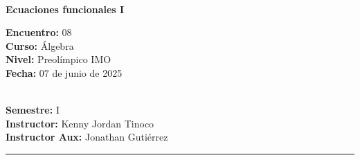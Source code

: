 \begin{center}
    \ \\
    \vspace{-4mm}
    \textbf{\Large Ecuaciones funcionales I}
\end{center}
\vspace{-5mm}
\begin{multicols}{2}
{
    \textbf{Encuentro:} 08\\
    \textbf{Curso:} Álgebra\\
    \textbf{Nivel:} Preolímpico IMO\\
    \textbf{Fecha:} 07 de junio de 2025\\
    \begin{flushright}
        \ \\
        \textbf{Semestre:} I\\
        \textbf{Instructor:} Kenny Jordan Tinoco\\
        \textbf{Instructor Aux:} Jonathan Gutiérrez
    \end{flushright}
}
\end{multicols}
\vspace{-4mm}
\hrule
\tableofcontents

\thispagestyle{first-page-style}